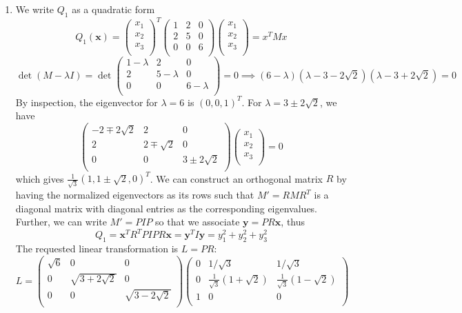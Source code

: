 \documentclass[a4paper]{article}
\begin{document}
\newpage
\begin{ans}\leavevmode
\begin{enumerate}[label=(\alph*)]
\item We write $Q_1$ as a quadratic form
$$Q_1(\mathbf{x})=\begin{pmatrix}x_1\\x_2\\x_3\\\end{pmatrix}^T\begin{pmatrix}1&2&0\\2&5&0\\0&0&6\\\end{pmatrix}\begin{pmatrix}x_1\\x_2\\x_3\\\end{pmatrix}=x^TMx$$
$$\det(M-\lambda I)=\det\begin{pmatrix}1-\lambda&2&0\\2&5-\lambda&0\\0&0&6-\lambda\\\end{pmatrix}=0\implies(6-\lambda)(\lambda-3-2\sqrt{2})(\lambda-3+2\sqrt{2})=0$$
By inspection, the eigenvector for $\lambda=6$ is $(0,0,1)^T$. For $\lambda=3\pm 2\sqrt{2}$, we have
$$\begin{pmatrix}-2\mp2\sqrt{2}&2&0\\2&2\mp\sqrt{2}&0\\0&0&3\pm2\sqrt{2}\\\end{pmatrix}\begin{pmatrix}x_1\\x_2\\x_3\\\end{pmatrix}=0$$
which gives $\frac{1}{\sqrt{3}}(1,1\pm\sqrt{2},0)^T$. We can construct an orthogonal matrix $R$ by having the normalized eigenvectors as its rows such that $M'=RMR^T$ is a diagonal matrix with diagonal entries as the corresponding eigenvalues. Further, we can write $M'=PIP$ so that we associate $\mathbf{y}=PR\mathbf{x}$, thus
$$Q_1=\mathbf{x}^TR^TPIPR\mathbf{x}=\mathbf{y}^TI\mathbf{y}=y_1^2+y_2^2+y_3^2$$
The requested linear transformation is $L=PR$:
$$L=\begin{pmatrix}\sqrt{6}&0&0\\0&\sqrt{3+2\sqrt{2}}&0\\0&0&\sqrt{3-2\sqrt{2}}\\\end{pmatrix}\begin{pmatrix}0&1/\sqrt{3}&1/\sqrt{3}\\0&\frac{1}{\sqrt{3}}(1+\sqrt{2})&\frac{1}{\sqrt{3}}(1-\sqrt{2})\\1&0&0\\\end{pmatrix}$$

\end{enumerate}
\end{ans}
\end{document}
